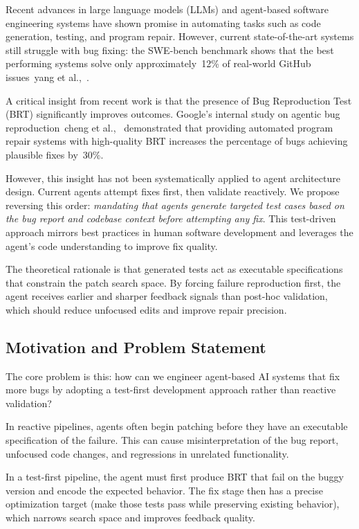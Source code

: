 \documentclass[12pt]{article}
\begin{document}
Recent advances in large language models (LLMs) and agent-based software engineering systems have shown promise in automating tasks such as code generation, testing, and program repair. However, current state-of-the-art systems still struggle with bug fixing: the SWE-bench benchmark shows that the best performing systems solve only approximately~12\% of real-world GitHub issues~yang et al.,~\cite{Yang2024SWEagent}.

A critical insight from recent work is that the presence of Bug Reproduction Test (BRT) significantly improves outcomes. Google's internal study on agentic bug reproduction~cheng et al.,~\cite{Cheng2025Agentic} demonstrated that providing automated program repair systems with high-quality BRT increases the percentage of bugs achieving plausible fixes by~30\%. 

However, this insight has not been systematically applied to agent architecture design. Current agents attempt fixes first, then validate reactively. We propose reversing this order: \emph{mandating that agents generate targeted test cases based on the bug report and codebase context before attempting any fix}. This test-driven approach mirrors best practices in human software development and leverages the agent's code understanding to improve fix quality.

The theoretical rationale is that generated tests act as executable specifications that constrain the patch search space. By forcing failure reproduction first, the agent receives earlier and sharper feedback signals than post-hoc validation, which should reduce unfocused edits and improve repair precision.

\subsection{Motivation and Problem Statement}

The core problem is this: how can we engineer agent-based AI systems that fix more bugs by adopting a test-first development approach rather than reactive validation?

In reactive pipelines, agents often begin patching before they have an executable specification of the failure. This can cause misinterpretation of the bug report, unfocused code changes, and regressions in unrelated functionality.

In a test-first pipeline, the agent must first produce BRT that fail on the buggy version and encode the expected behavior. The fix stage then has a precise optimization target (make those tests pass while preserving existing behavior), which narrows search space and improves feedback quality.
\end{document}
